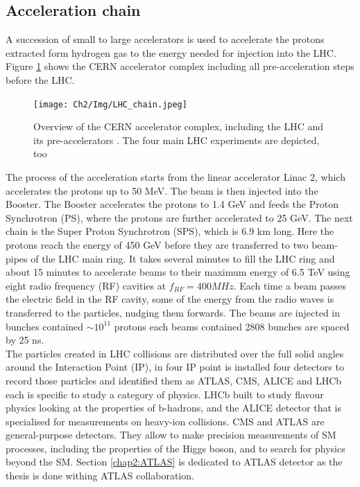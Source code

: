 \subsection{Acceleration chain}
\label{chap2:LHC:chain}
A succession of small to large accelerators is used to accelerate the protons extracted form hydrogen gas to the energy needed for injection into the LHC. Figure \ref{fig:chap2:LHC:chain} shows the CERN accelerator complex including all pre-acceleration steps before the LHC.
\begin{figure}[ht]
    \centering
    \texttt{[image: Ch2/Img/LHC\_chain.jpeg]}
    \caption{Overview of the CERN accelerator complex, including the LHC and its pre-accelerators \cite{LHC_chain}. The four main LHC experiments are depicted, too}
    \label{fig:chap2:LHC:chain}
\end{figure}
The process of the acceleration starts from the linear accelerator Linac 2, which accelerates the protons up to 50 MeV. The beam is then injected into the Booster. The Booster accelerates the protons to 1.4 GeV and feeds the Proton Synchrotron (PS), where the protons are further accelerated to 25 GeV. The next chain is the Super Proton Synchrotron (SPS), which is 6.9 km long. Here the protons reach the energy of 450 GeV before they are transferred to two beam-pipes of the LHC main ring. It takes several minutes to fill the LHC ring and about 15 minutes to accelerate beams to their maximum energy of 6.5 TeV using eight radio frequency (RF) cavities at $f_{RF} = 400 MHz$. Each time a beam passes the electric field in the RF cavity, some of the energy from the radio waves is transferred to the particles, nudging them forwards. The beams are injected in bunches contained $\sim 10^{11}$ protons each beams contained 2808 bunches are spaced by 25 ns. \\
The particles created in LHC collisions are distributed over the full solid angles around the Interaction Point (IP), in four IP point is installed four detectors to record those particles and identified them as ATLAS, CMS, ALICE and LHCb each is specific to study a category of physics. LHCb built to study flavour physics looking at the properties of b-hadrons, and the ALICE detector that is specialised for measurements on heavy-ion collisions. CMS and ATLAS are general-purpose detectors. They allow to make precision measurements of SM processes, including the properties of the Higgs boson, and to search for physics beyond the SM. Section \ref{chap2:ATLAS} is dedicated to ATLAS detector as the thesis is done withing ATLAS collaboration.
